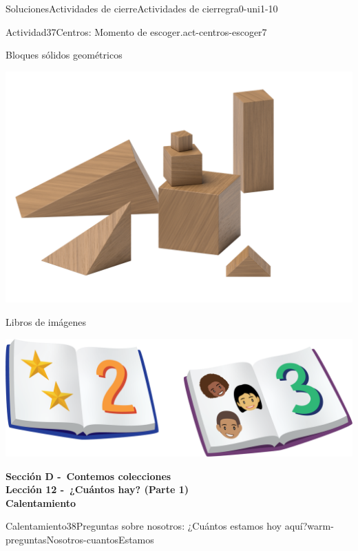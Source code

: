 \documentclass[twoside,10pt,]{article}
\begin{document}
\begin{solutions-section}{Soluciones}{Actividades de cierre}{}{Actividades de cierre}{}{}{gra0-uni1-10}
\begin{activitysolution}{Actividad}{37}{Centros: Momento de escoger.}{act-centros-escoger7}
\begin{sidebyside}{2}{0.025}{0.025}{0.05}
\begin{sbspanel}{0.45}
\end{sbspanel}%
\end{sidebyside}%
\begin{sidebyside}{2}{0.025}{0.025}{0.05}%
\begin{sbspanel}{0.45}%
Bloques sólidos geométricos%
\par
\includegraphics[width=\linewidth]{external/png-source/K.1.A Beta Student Workbook.Geoblocks.png}
\end{sbspanel}%
\begin{sbspanel}{0.45}%
Libros de imágenes%
\par
\includegraphics[width=\linewidth]{external/png-source/K.1.D Beta Student Workbooks.Books.png}
\end{sbspanel}%
\end{sidebyside}%
\end{activitysolution}%
\par\medskip
\noindent\textbf{\large{}\space\textperiodcentered\space{}Sección D -~Contemos colecciones\\
\space\textperiodcentered\space{}Lección 12 -~¿Cuántos hay? (Parte 1)\\
\space\textperiodcentered\space{}Calentamiento}
\begin{explorationsolution}{Calentamiento}{38}{Preguntas sobre nosotros: ¿Cuántos estamos hoy aquí?}{warm-preguntasNosotros-cuantosEstamos}%

\end{explorationsolution}
\end{solutions-section}
\end{document}
